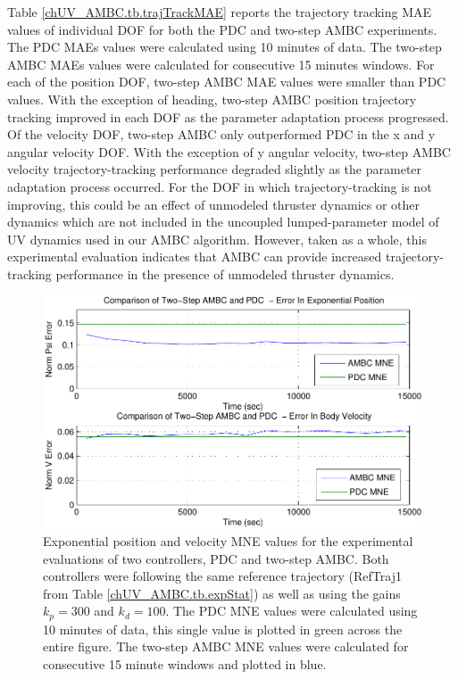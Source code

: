 Table \ref{chUV_AMBC.tb.trajTrackMAE} reports the trajectory tracking
\ac{MAE} values of individual \ac{DOF} for both the \ac{PDC} and
two-step \ac{AMBC} experiments.
%
The \ac{PDC} \acp{MAE} values were calculated using 10 minutes of
data.  
%
The two-step \ac{AMBC} \acp{MAE} values were calculated
for consecutive 15 minutes windows.
%
For each of the position \ac{DOF}, two-step \ac{AMBC} \ac{MAE} values
were smaller than \ac{PDC} values.
%
With the exception of heading, two-step \ac{AMBC} position trajectory
tracking improved in each \ac{DOF} as the parameter adaptation process
progressed.
%
Of the velocity \ac{DOF}, two-step \ac{AMBC} only outperformed
\ac{PDC} in the x and y angular velocity \ac{DOF}.
%
With the exception of y angular velocity, two-step \ac{AMBC} velocity
trajectory-tracking performance degraded slightly as the parameter
adaptation process occurred.
%
For the \ac{DOF} in which trajectory-tracking is not improving, this
could be an effect of unmodeled thruster dynamics or other dynamics
which are not included in the uncoupled lumped-parameter model of
\ac{UV} dynamics used in our \ac{AMBC} algorithm.
%
However, taken as a whole, this experimental evaluation indicates that
\ac{AMBC} can provide increased trajectory-tracking performance in the
presence of unmodeled thruster dynamics.




\begin{center}
\begin{figure}[htbp]
  \begin{center}
    \includegraphics[width=150mm]{./chUV_AMBC/images/MNE_All}
  \end{center}
  \caption{ Exponential position and velocity \ac{MNE} values for the
    experimental evaluations of two controllers, \ac{PDC} and two-step
    \ac{AMBC}.  Both controllers were following the same reference
    trajectory (RefTraj1 from Table \ref{chUV_AMBC.tb.expStat}) as
    well as using the gains $k_p=300$ and $k_d=100$.  The \ac{PDC}
    \ac{MNE} values were calculated using 10 minutes of data, this
    single value is plotted in green across the entire figure.  The
    two-step \ac{AMBC} \ac{MNE} values were calculated for consecutive
    15 minute windows and plotted in blue. }
  \label{chUV_AMBC.fig.MNE_All}
\vspace*{-5mm}
\end{figure}
\end{center}

